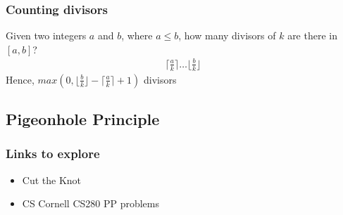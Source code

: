\documentclass{article}
\begin{document}
\subsubsection{Counting divisors}
Given two integers $a$ and $b$, where $a\leq b$, how many divisors of $k$ are there in $[a,b]$?
\begin{align*}
	\lceil \frac{a}{k} \rceil \dots \lfloor \frac{b}{k} \rfloor
\end{align*}
Hence, $max(0, \lfloor \frac{b}{k} \rfloor - \lceil \frac{a}{k} \rceil + 1)$ divisors


\subsection{Pigeonhole Principle}
\subsubsection{Links to explore}
\begin{itemize}
    \item Cut the Knot
    \item CS Cornell CS280 PP problems
\end{itemize}
\end{document}

